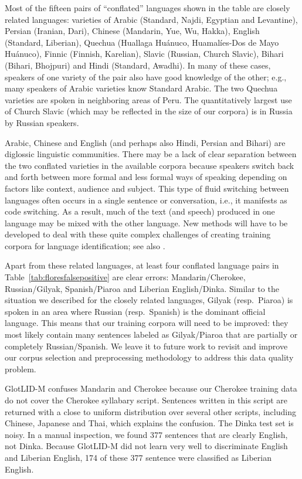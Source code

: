 \documentclass[11pt]{article}
\def\modelname{\mbox{GlotLID-M}\xspace}
\def\tabref#1{Table~\ref{tab:#1}}
\begin{document}
Most of the fifteen pairs of ``conflated'' languages
shown in the table are
closely related languages: varieties of Arabic (Standard,
Najdi, Egyptian and Levantine), Persian (Iranian, Dari), Chinese (Mandarin, Yue,
Wu, Hakka), English (Standard, Liberian), Quechua (Huallaga
Huánuco, Huamalíes-Dos de Mayo Huánuco), Finnic (Finnish,
Karelian), Slavic (Russian, Church Slavic), Bihari
(Bihari, Bhojpuri) and Hindi (Standard, Awadhi).  In many of
these cases, speakers of one variety of the pair also have
good knowledge of the other; e.g., many speakers of Arabic
varieties know Standard Arabic. The two Quechua varieties
are spoken in neighboring areas of Peru. The quantitatively
largest use of Church Slavic  (which may be reflected in the
size of our corpora) is in Russia by Russian speakers.

Arabic, Chinese and English (and perhaps also Hindi,
Persian and Bihari) are diglossic linguistic communities.
There may be a lack of  clear separation between
the two conflated varieties  in the available corpora because
speakers switch back and forth between more formal and less
formal ways of speaking depending on factors like context,
audience and subject.
This type of fluid switching between languages often occurs
in a single sentence or conversation, i.e., it manifests as code switching.
As a result, much of the text (and
speech) produced in one language may be mixed with the
other language.
New methods will have to be developed
to deal with these quite complex challenges of
creating training corpora for
language identification; see also \cite{aguilar-etal-2020-lince}.


Apart from these related languages, at least four
conflated language pairs
in \tabref{floresfalsepositive}
are clear errors:
Mandarin/Cherokee, Russian/Gilyak, Spanish/Piaroa and
Liberian English/Dinka.
Similar to the situation we described for the closely
related languages,
Gilyak (resp.\ Piaroa) is spoken in an area where Russian
(resp.\ Spanish)
is the dominant
official language.
This means that our training corpora will need to be
improved: they most likely contain many
sentences labeled as Gilyak/Piaroa that are partially or
completely Russian/Spanish. 
We leave it to future work to
revisit and improve our corpus selection and preprocessing
methodology to address this data quality problem.



\modelname confuses
Mandarin and Cherokee because
our Cherokee training data do not cover
the Cherokee syllabary script.
Sentences written in this script are returned with a
close to uniform distribution over several other scripts,
including Chinese, Japanese and Thai, which explains the confusion.
The Dinka test set is noisy. In a manual inspection, we
found 377 sentences that are clearly English, not
Dinka. Because \modelname did not learn very well to discriminate
English and Liberian English, 174 of these 377 sentence were
classified as Liberian English.
\end{document}
